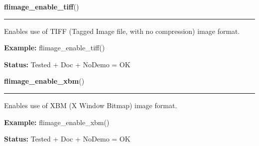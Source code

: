 \hspace{.8\funcindent}\begin{boxedminipage}{\funcwidth}

    \raggedright \textbf{flimage\_enable\_tiff}()

    \vspace{-1.5ex}

    \rule{\textwidth}{0.5\fboxrule}
\setlength{\parskip}{2ex}
    Enables use of TIFF (Tagged Image file, with no compression) image 
    format.

\setlength{\parskip}{1ex}
\textbf{Example:} flimage\_enable\_tiff()



\textbf{Status:} Tested + Doc + NoDemo = OK



    \end{boxedminipage}

    \label{xformslib:flflimage:flimage_enable_xbm}

    \vspace{0.5ex}

\hspace{.8\funcindent}\begin{boxedminipage}{\funcwidth}

    \raggedright \textbf{flimage\_enable\_xbm}()

    \vspace{-1.5ex}

    \rule{\textwidth}{0.5\fboxrule}
\setlength{\parskip}{2ex}
    Enables use of XBM (X Window Bitmap) image format.

\setlength{\parskip}{1ex}
\textbf{Example:} flimage\_enable\_xbm()



\textbf{Status:} Tested + Doc + NoDemo = OK



    \end{boxedminipage}

    \label{xformslib:flflimage:flimage_enable_xpm}

    \vspace{0.5ex}

